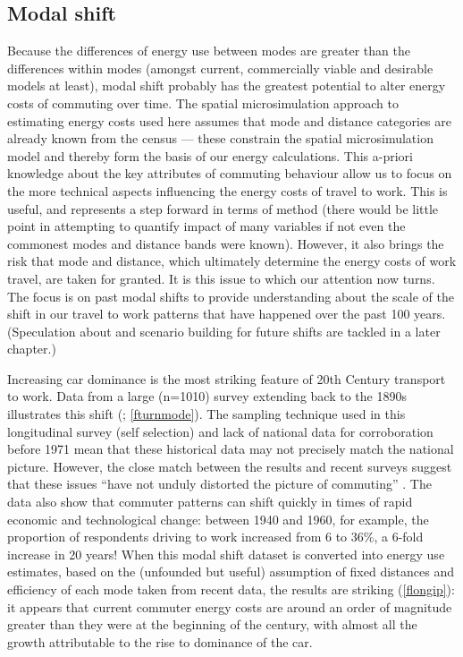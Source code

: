 \documentclass[a4paper, 11pt, twoside]{Thesis}
\begin{document}
\subsection{Modal shift}
Because the differences of energy use between modes are greater than the
differences within modes (amongst current, commercially viable and desirable
models at least),
modal shift probably has the greatest potential to alter energy costs of commuting
over time. The spatial microsimulation approach to estimating energy costs used
here assumes that mode and distance categories are already known from the
census --- these constrain the spatial microsimulation model and thereby form
the basis of our energy calculations. This a-priori knowledge about the key attributes
of commuting behaviour allow us to focus on the more technical aspects influencing
the energy costs of travel to work. This is useful, and represents a step forward
in terms of method (there would be little point in attempting to quantify
impact of many variables if not even the commonest modes and distance bands
were known). However, it also brings the risk that mode and distance, which ultimately
determine the energy costs of work travel, are taken for granted.
It is this issue to which our attention now turns. The focus is on past modal
shifts  to provide understanding about the scale of the
shift in our travel to work patterns that have happened over the past 100 years.
(Speculation about and scenario building for future shifts are tackled
in a later chapter.)

Increasing car dominance is the most striking feature of 20th Century transport
to work. Data from a large (n=1010) survey extending back to the 1890s
illustrates this shift (\citealp{Turnbull2000}; \cref{fturnmode}).
The sampling technique used in
this longitudinal survey (self selection) and lack of national data for
corroboration before 1971 mean that these historical data may not precisely
match the national picture. However, the close match between the results and
recent surveys suggest that these issues ``have not unduly distorted the picture
of commuting'' \citep[p.~13]{Turnbull2000}⁠.  The data also show that commuter patterns can
shift quickly in times of rapid economic and technological change: between 1940
and 1960, for example, the proportion of respondents  driving to work increased
from 6 to 36\%, a 6-fold increase in 20 years! When this modal shift dataset is
converted into energy use estimates, based on the (unfounded but useful)
assumption of fixed distances and efficiency of each mode taken from recent
data, the results are striking (\cref{flongip}): it appears that current
commuter energy costs are around an order of magnitude greater than they were
at the beginning of the century, with almost all the growth attributable to
the rise to dominance of the car.
\end{document}
